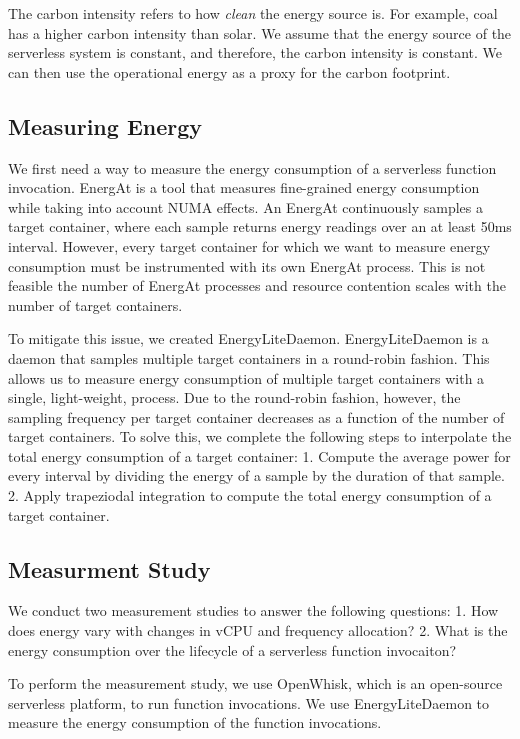 \documentclass[times, 10pt,twocolumn]{article}
\begin{document}
The carbon intensity refers to how \textit{clean} the energy source is. For example, coal has a higher carbon intensity than solar. We assume that the energy source of the serverless system is constant, and therefore, the carbon intensity is constant. We can then use the operational energy as a proxy for the carbon footprint.

\subsection{Measuring Energy}
We first need a way to measure the energy consumption of a serverless function invocation. EnergAt \cite{he2023hotcarbon} is a tool that measures fine-grained energy consumption while taking into account NUMA effects. An EnergAt continuously samples a target container, where each sample returns energy readings over an at least 50ms interval. However, every target container for which we want to measure energy consumption must be instrumented with its own EnergAt process. This is not feasible the number of EnergAt processes and resource contention scales with the number of target containers.

To mitigate this issue, we created EnergyLiteDaemon. EnergyLiteDaemon is a daemon that samples multiple target containers in a round-robin fashion. This allows us to measure energy consumption of multiple target containers with a single, light-weight, process. Due to the round-robin fashion, however, the sampling frequency per target container decreases as a function of the number of target containers. To solve this, we complete the following steps to interpolate the total energy consumption of a target container: 1. Compute the average power for every interval by dividing the energy of a sample by the duration of that sample. 2. Apply trapeziodal integration to compute the total energy consumption of a target container. 

\subsection{Measurment Study}

We conduct two measurement studies to answer the following questions: 1. How does energy vary with changes in vCPU and frequency allocation? 2. What is the energy consumption over the lifecycle of a serverless function invocaiton?

To perform the measurement study, we use OpenWhisk, which is an open-source serverless platform, to run function invocations. We use EnergyLiteDaemon to measure the energy consumption of the function invocations.
\end{document}
